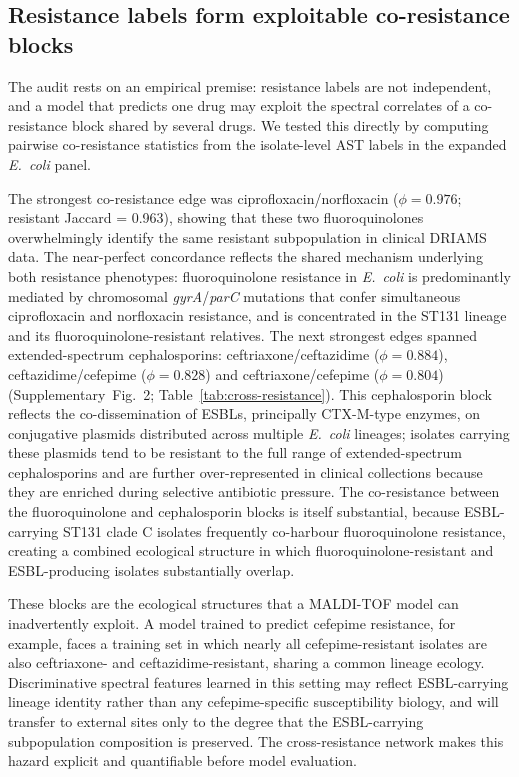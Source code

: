 \documentclass[11pt]{article}
\begin{document}


\subsection*{Resistance labels form exploitable co-resistance blocks}

The audit rests on an empirical premise: resistance labels are not independent, and a model that predicts one drug may exploit the spectral correlates of a co-resistance block shared by several drugs. We tested this directly by computing pairwise co-resistance statistics from the isolate-level AST labels in the expanded \textit{E.~coli} panel.

The strongest co-resistance edge was ciprofloxacin/norfloxacin ($\phi = 0.976$; resistant Jaccard = 0.963), showing that these two fluoroquinolones overwhelmingly identify the same resistant subpopulation in clinical DRIAMS data. The near-perfect concordance reflects the shared mechanism underlying both resistance phenotypes: fluoroquinolone resistance in \textit{E.~coli} is predominantly mediated by chromosomal \textit{gyrA}/\textit{parC} mutations that confer simultaneous ciprofloxacin and norfloxacin resistance, and is concentrated in the ST131 lineage and its fluoroquinolone-resistant relatives. The next strongest edges spanned extended-spectrum cephalosporins: ceftriaxone/ceftazidime ($\phi = 0.884$), ceftazidime/cefepime ($\phi = 0.828$) and ceftriaxone/cefepime ($\phi = 0.804$) (Supplementary~Fig.~2; Table~\ref{tab:cross-resistance}). This cephalosporin block reflects the co-dissemination of ESBLs, principally CTX-M-type enzymes, on conjugative plasmids distributed across multiple \textit{E.~coli} lineages; isolates carrying these plasmids tend to be resistant to the full range of extended-spectrum cephalosporins and are further over-represented in clinical collections because they are enriched during selective antibiotic pressure. The co-resistance between the fluoroquinolone and cephalosporin blocks is itself substantial, because ESBL-carrying ST131 clade C isolates frequently co-harbour fluoroquinolone resistance, creating a combined ecological structure in which fluoroquinolone-resistant and ESBL-producing isolates substantially overlap.

These blocks are the ecological structures that a MALDI-TOF model can inadvertently exploit. A model trained to predict cefepime resistance, for example, faces a training set in which nearly all cefepime-resistant isolates are also ceftriaxone- and ceftazidime-resistant, sharing a common lineage ecology. Discriminative spectral features learned in this setting may reflect ESBL-carrying lineage identity rather than any cefepime-specific susceptibility biology, and will transfer to external sites only to the degree that the ESBL-carrying subpopulation composition is preserved. The cross-resistance network makes this hazard explicit and quantifiable before model evaluation.
\end{document}
